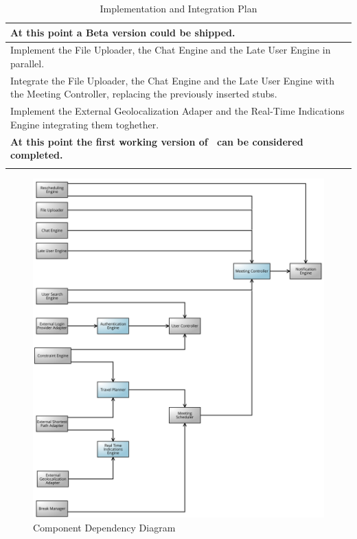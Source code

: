 \begin{longtable}{|m{16cm}|}
	\\ \hline
	\textbf{At this point a Beta version could be shipped.}
	\\ \hline Implement the File Uploader, the Chat Engine and the Late User Engine in parallel.
	\\ \hline Integrate the File Uploader, the Chat Engine and the Late User Engine with the Meeting Controller, replacing the previously inserted stubs.
	\\ \hline Implement the External Geolocalization Adaper and the Real-Time Indications Engine integrating them toghether.
	\\ \hline
	\textbf{At this point the first working version of \projectname~can be considered completed.} \\ \hline
	\caption{Implementation and Integration Plan}
\end{longtable}

\begin{figure}[!h]
	\centering\includegraphics[scale = 0.19]{Images/UMLDiagrams/DependencyDiagramColored.png}
	\caption{Component Dependency Diagram}
\end{figure}

\clearpage